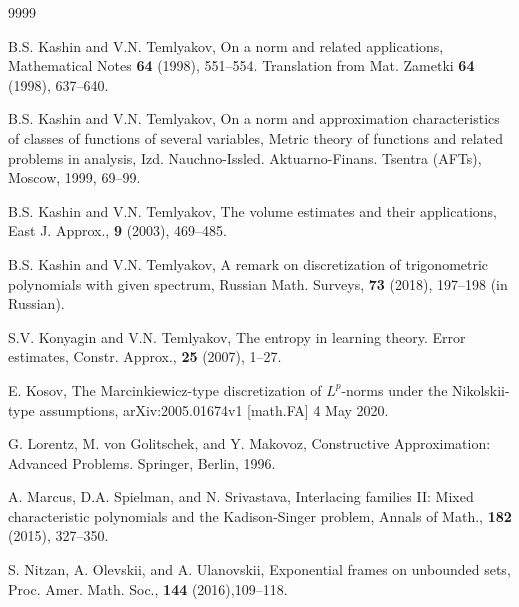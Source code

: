 \documentclass[12pt]{article}
\numberwithin{equation}{section}
\begin{document}
\begin{thebibliography}{9999}

 B.S. Kashin and V.N. Temlyakov, On a norm and related applications,
Mathematical Notes {\bf 64} (1998), 551--554. Translation from
 Mat. Zametki {\bf 64} (1998),  637--640.

 B.S. Kashin and V.N. Temlyakov, On a norm and approximation characteristics of classes of functions of several variables,
Metric theory of functions and related problems in analysis, Izd. Nauchno-Issled. Aktuarno-Finans. Tsentra (AFTs), Moscow, 1999, 69--99.

 B.S. Kashin and V.N. Temlyakov, The volume estimates and their applications,  East J. Approx., {\bf 9}  (2003), 469--485.

 B.S. Kashin and V.N. Temlyakov, A remark on discretization of trigonometric polynomials with given spectrum, Russian Math. Surveys, {\bf 73} (2018), 197--198 (in Russian).

 S.V. Konyagin and V.N. Temlyakov, The entropy in learning theory. Error estimates, Constr. Approx., {\bf 25} (2007), 1--27.
	
  E. Kosov, The Marcinkiewicz-type discretization
of $L^p$-norms under the Nikolskii-type assumptions, arXiv:2005.01674v1 [math.FA] 4 May 2020.


 G. Lorentz, M. von Golitschek, and Y. Makovoz, Constructive Approximation: Advanced Problems. {S}pringer, Berlin, 1996.

 A. Marcus, D.A. Spielman, and N. Srivastava,
Interlacing families II: Mixed characteristic polynomials and the Kadison-Singer problem, Annals of Math., {\bf 182} (2015), 327--350.

 S. Nitzan, A. Olevskii, and A. Ulanovskii,
{Exponential frames on unbounded sets}, Proc. Amer. Math. Soc., {\bf 144} (2016),109--118.




\end{thebibliography}
\end{document}
